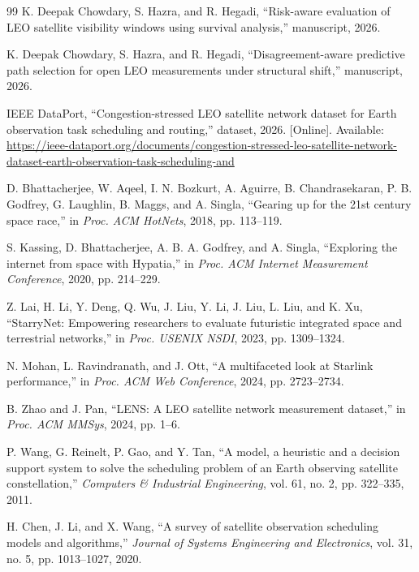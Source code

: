 \documentclass[conference]{IEEEtran}
\begin{document}
\balance
\begin{thebibliography}{99}
K. Deepak Chowdary, S. Hazra, and R. Hegadi, ``Risk-aware evaluation of LEO satellite visibility windows using survival analysis,'' manuscript, 2026.

K. Deepak Chowdary, S. Hazra, and R. Hegadi, ``Disagreement-aware predictive path selection for open LEO measurements under structural shift,'' manuscript, 2026.

IEEE DataPort, ``Congestion-stressed LEO satellite network dataset for Earth observation task scheduling and routing,'' dataset, 2026. [Online]. Available: \url{https://ieee-dataport.org/documents/congestion-stressed-leo-satellite-network-dataset-earth-observation-task-scheduling-and}

D. Bhattacherjee, W. Aqeel, I. N. Bozkurt, A. Aguirre, B. Chandrasekaran, P. B. Godfrey, G. Laughlin, B. Maggs, and A. Singla, ``Gearing up for the 21st century space race,'' in \emph{Proc. ACM HotNets}, 2018, pp. 113--119.

S. Kassing, D. Bhattacherjee, A. B. A. Godfrey, and A. Singla, ``Exploring the internet from space with Hypatia,'' in \emph{Proc. ACM Internet Measurement Conference}, 2020, pp. 214--229.

Z. Lai, H. Li, Y. Deng, Q. Wu, J. Liu, Y. Li, J. Liu, L. Liu, and K. Xu, ``StarryNet: Empowering researchers to evaluate futuristic integrated space and terrestrial networks,'' in \emph{Proc. USENIX NSDI}, 2023, pp. 1309--1324.

N. Mohan, L. Ravindranath, and J. Ott, ``A multifaceted look at Starlink performance,'' in \emph{Proc. ACM Web Conference}, 2024, pp. 2723--2734.

B. Zhao and J. Pan, ``LENS: A LEO satellite network measurement dataset,'' in \emph{Proc. ACM MMSys}, 2024, pp. 1--6.

P. Wang, G. Reinelt, P. Gao, and Y. Tan, ``A model, a heuristic and a decision support system to solve the scheduling problem of an Earth observing satellite constellation,'' \emph{Computers \& Industrial Engineering}, vol. 61, no. 2, pp. 322--335, 2011.

H. Chen, J. Li, and X. Wang, ``A survey of satellite observation scheduling models and algorithms,'' \emph{Journal of Systems Engineering and Electronics}, vol. 31, no. 5, pp. 1013--1027, 2020.


\end{thebibliography}
\end{document}
